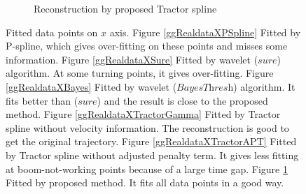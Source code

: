 \begin{figure}
\begin{subfigure}{0.45\textwidth}
    \caption{Reconstruction by proposed Tractor spline}\label{ggRealdataXTractor}
    \end{subfigure}
 \caption{Fitted data points on $x$ axis. Figure \ref{ggRealdataXPSpline} Fitted by P-spline, which gives over-fitting on these points and misses some information. Figure \ref{ggRealdataXSure} Fitted by wavelet ($\textit{sure}$) algorithm. At some turning points, it gives over-fitting. Figure \ref{ggRealdataXBayes} Fitted by wavelet ($\textit{BayesThresh}$) algorithm. It fits better than ($\textit{sure}$) and the result is close to the proposed method. Figure \ref{ggRealdataXTractorGamma} Fitted by Tractor spline without velocity information. The reconstruction is good to get the original trajectory. Figure \ref{ggRealdataXTractorAPT} Fitted by Tractor spline without adjusted penalty term. It gives less fitting at boom-not-working points because of a large time gap. Figure \ref{ggRealdataXTractor} Fitted by proposed method. It fits all data points in a good way.}\label{1dx}
 \end{figure}





